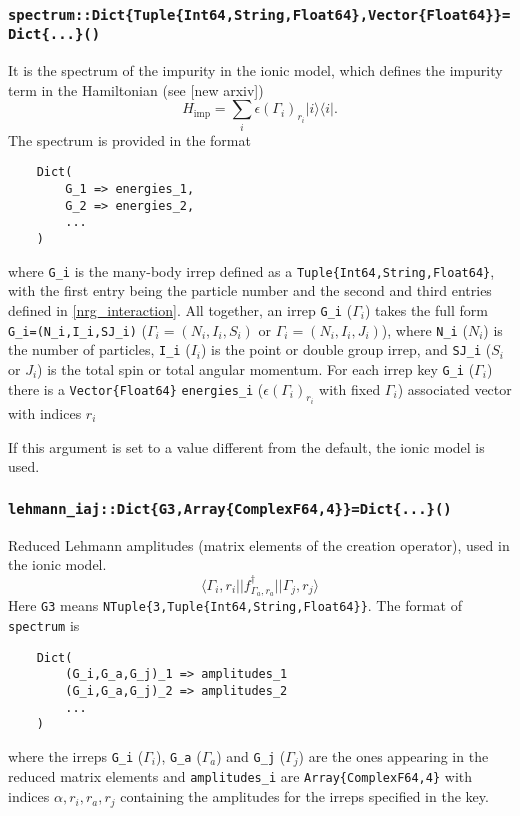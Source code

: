 \documentclass[notitlepage]{article}
\newcommand{\ket}[1]{|#1\rangle}
\newcommand{\bra}[1]{\langle #1 |}
\begin{document}
\subsubsection{\texttt{spectrum::Dict\{Tuple\{Int64,String,Float64\},Vector\{Float64\}\}=Dict\{...\}()}}
\label{nrg_spectrum}
It is the spectrum of the impurity in the ionic model, which
defines the impurity term in the Hamiltonian (see [new
arxiv])
\begin{equation}
    H_\text{imp}
    =
    \sum_i
    \epsilon(\Gamma_i)_{r_i}
    \ket{i}\bra{i}.
\end{equation}
The spectrum is provided in the format
\begin{verbatim}
    Dict(
        G_1 => energies_1,
        G_2 => energies_2,
        ...
    )
\end{verbatim}
where \texttt{G\_i} is the many-body irrep defined as a
\texttt{Tuple\{Int64,String,Float64\}}, with the first entry
being the particle number and the second and third entries
defined in \ref{nrg_interaction}. All together, an irrep
\texttt{G\_i} ($\Gamma_i$) takes the full form
\texttt{G\_i=(N\_i,I\_i,SJ\_i)} ($\Gamma_i=(N_i,I_i,S_i)$ or
$\Gamma_i=(N_i,I_i,J_i)$), where \texttt{N\_i} ($N_i$) is
the number of particles, \texttt{I\_i} ($I_i$) is the point
or double group irrep, and \texttt{SJ\_i} ($S_i$ or $J_i$)
is the total spin or total angular momentum. For each irrep
key \texttt{G\_i} ($\Gamma_i$) there is a
\texttt{Vector\{Float64\}} \texttt{energies\_i} ($\epsilon(\Gamma_i)_{r_i}$ with fixed
$\Gamma_i$) associated vector with indices $r_i$
\par
If this argument is set to a value different from the
default, the ionic model is used.

\subsubsection{\texttt{lehmann\_iaj::Dict\{G3,Array\{ComplexF64,4\}\}=Dict\{...\}()}}
\label{nrg_lehmanniaj}
Reduced Lehmann amplitudes (matrix elements of the creation
operator), used in the ionic model.
\begin{equation}
    \bra{\Gamma_i,r_i}| 
    f^\dagger_{\Gamma_a,r_a}
    |\ket{\Gamma_j,r_j}
\end{equation}
Here \texttt{G3} means
\texttt{NTuple\{3,Tuple\{Int64,String,Float64\}\}}. The
format of \texttt{spectrum} is
\begin{verbatim}
    Dict(
        (G_i,G_a,G_j)_1 => amplitudes_1
        (G_i,G_a,G_j)_2 => amplitudes_2
        ...
    )
\end{verbatim}
where the irreps \texttt{G\_i} ($\Gamma_i$), \texttt{G\_a}
($\Gamma_a$) and \texttt{G\_j} ($\Gamma_j$) are the ones
appearing in the reduced matrix elements and 
\texttt{amplitudes\_i} are \texttt{Array\{ComplexF64,4\}} 
with indices $\alpha,r_i,r_a,r_j$ containing the amplitudes
for the irreps specified in the key.
\end{document}
